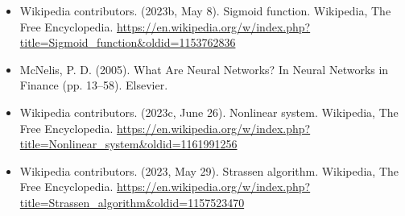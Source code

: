 \documentclass[12pt]{book}
\begin{document}
\begin{itemize}
\item Wikipedia contributors. (2023b, May 8). Sigmoid function. Wikipedia, The Free Encyclopedia.
  \url{https://en.wikipedia.org/w/index.php?title=Sigmoid_function&oldid=1153762836}
\item McNelis, P. D. (2005). What Are Neural Networks? In Neural Networks in Finance (pp. 13–58). Elsevier.
\item  Wikipedia contributors. (2023c, June 26). Nonlinear system. Wikipedia, The Free Encyclopedia.
  \url{https://en.wikipedia.org/w/index.php?title=Nonlinear_system&oldid=1161991256}
\item Wikipedia contributors. (2023, May 29). Strassen algorithm. Wikipedia, The Free Encyclopedia.
  \url{https://en.wikipedia.org/w/index.php?title=Strassen_algorithm&oldid=1157523470}




\end{itemize}
\end{document}
